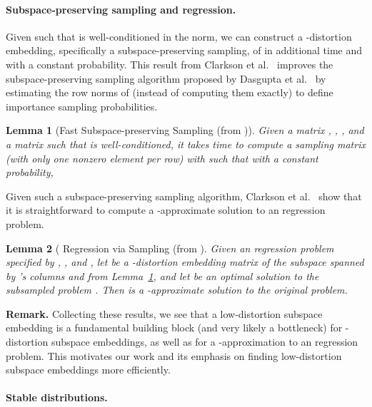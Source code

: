 \documentclass[11pt]{article}
\newtheorem{lemma}{Lemma}
\begin{document}
\paragraph{Subspace-preserving sampling and  regression.}
Given  such that  is well-conditioned in the
 norm, we can construct a -distortion embedding,
specifically a subspace-preserving sampling, of  in  additional time and with a constant probability.
This result from Clarkson et al.~\cite[Theorem 5.4]{CDMMMW13_SODA} improves 
the subspace-preserving sampling algorithm proposed by Dasgupta et 
al.~\cite{DDHKM09_lp_SICOMP} by estimating the row norms of 
(instead of computing them exactly) to define importance sampling 
probabilities.

\begin{lemma}[Fast Subspace-preserving Sampling (from \cite{CDMMMW13_SODA})]
  \label{lemma:fast_sampling}
  Given a matrix , , ,
  and a matrix  such that  is well-conditioned,
  it takes  time to compute a sampling matrix  (with only one nonzero element per row) with 
  such that with a constant probability,
  
\end{lemma}

\noindent
Given such a subspace-preserving sampling algorithm, Clarkson et
al.~\cite[Theorem 5.4]{CDMMMW13_SODA} show that it is straightforward to
compute a -approximate solution to an 
regression problem.

\begin{lemma}[ Regression via Sampling (from \cite{CDMMMW13_SODA}]
  \label{lemma:fast_reg}
  Given an  regression problem specified by , , and , let  be a -distortion
  embedding matrix of the subspace spanned by 's columns and  from
  Lemma~\ref{lemma:fast_sampling}, and let  be an optimal solution to
  the subsampled problem .
  Then  is a -approximate solution to
  the original problem.
\end{lemma}

\noindent
\textbf{Remark.}
Collecting these results, we see that a low-distortion  subspace
embedding is a fundamental building block (and very likely a bottleneck) for
-distortion  subspace embeddings, as well as for a
-approximation to an  regression problem. 
This motivates our work and its emphasis on finding low-distortion subspace 
embeddings more efficiently.

\paragraph{Stable distributions.}
\label{sec:stable-distributions}
\end{document}
